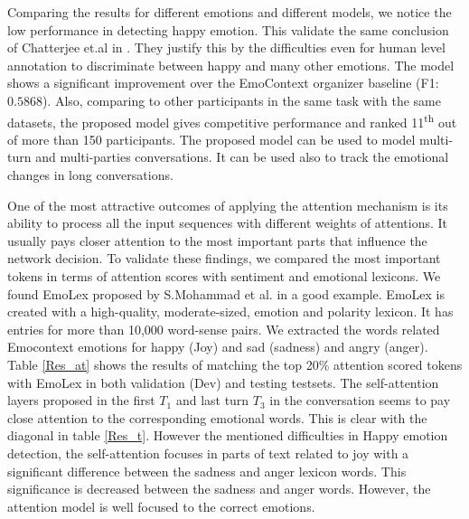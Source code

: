 \documentclass{article}
\begin{document}
Comparing the results for different emotions and different models, we notice the low performance in detecting happy emotion. This validate the same conclusion of Chatterjee et.al in . They justify this by the difficulties even for human level annotation to discriminate between happy and many other emotions. 
The model shows a significant improvement over the EmoContext organizer baseline (F1: $0.5868$). Also, comparing to other participants in the same task with the same datasets, the proposed model gives competitive performance and ranked 11\textsuperscript{th} out of more than 150 participants. The proposed model can be used to model multi-turn and multi-parties conversations. It can be used also to track the emotional changes in long conversations.

One of the most attractive outcomes of applying the attention mechanism is its ability to process all the input sequences with different weights of attentions. It usually pays closer attention to the most important parts that influence the network decision. To validate these findings, we compared the most important tokens in terms of attention scores with sentiment and emotional lexicons. We found EmoLex proposed by S.Mohammad et al. in   a good example. EmoLex is created with a high-quality, moderate-sized, emotion and polarity lexicon. It has entries for more than 10,000 word-sense pairs. We extracted the words related Emocontext emotions for happy (Joy) and sad (sadness) and angry (anger). Table \ref{Res_at} shows the results of matching the top 20\% attention scored tokens with EmoLex in both validation (Dev) and testing testsets. The self-attention layers proposed in the first $T_1$ and last turn $T_3$ in the conversation seems to pay close attention to the corresponding emotional words. This is clear with the diagonal in table \ref{Res_t}. However the mentioned difficulties in Happy emotion detection, the self-attention focuses in parts of text related to joy with a significant difference between the sadness and anger lexicon words. This significance is decreased between the sadness and anger words. However, the attention model is well focused to the correct emotions.  
\end{document}
